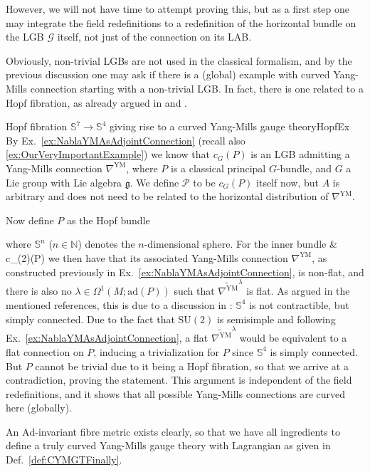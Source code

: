 \documentclass[a4paper,oneside,11pt,bibliography=totoc]{scrartcl}
\def\bas#1\eas{\begin{align*}#1\end{align*}}
\theoremstyle{plain}
\theoremstyle{remark}
\theoremstyle{definition}
\begin{document}
However, we will not have time to attempt proving this, but as a first step one may integrate the field redefinitions to a redefinition of the horizontal bundle on the LGB $\mathcal{G}$ itself, not just of the connection on its LAB.

Obviously, non-trivial LGBs are not used in the classical formalism, and by the previous discussion one may ask if there is a (global) example with curved Yang-Mills connection starting with a non-trivial LGB. In fact, there is one related to a Hopf fibration, as already argued in \cite[\S 5.3, Ex.\ 5.18]{My1stpaper} and \cite[\S 5.1.5, Ex.\ 5.1.35]{MyThesis}.

\begin{examples}{Hopf fibration $\mathds{S}^7 \to \mathds{S}^4$ giving rise to a curved Yang-Mills gauge theory}{HopfEx}
By Ex.\ \ref{ex:NablaYMAsAdjointConnection} (recall also \ref{ex:OurVeryImportantExample}) we know that $c_G(P)$ is an LGB admitting a Yang-Mills connection $\nabla^{\mathrm{YM}}$, where $P$ is a classical principal $G$-bundle, and $G$ a Lie group with Lie algebra $\mathfrak{g}$. We define $\mathcal{P}$ to be $c_G(P)$ itself now, but $A$ is arbitrary and does not need to be related to the horizontal distribution of $\nabla^{\mathrm{YM}}$.

Now define $P$ as the Hopf bundle
\begin{center}
\end{center}
where $\mathds{S}^n$ ($n \in \mathbb{N}$) denotes the $n$-dimensional sphere.
For the inner bundle
\bas
\mathcal{P}
\coloneqq
{}
&\coloneqq
c_{(2)}(P)
\eas
we then have that its associated Yang-Mills connection $\nabla^{\mathrm{YM}}$, as constructed previously in Ex.\ \ref{ex:NablaYMAsAdjointConnection}, is non-flat, and there is also no $\lambda \in \Omega^1(M; \mathrm{ad}(P))$ such that $\widetilde{\nabla^{\mathrm{YM}}}^\lambda$ is flat. As argued in the mentioned references, this is due to a discussion in \cite[Example 7.3.20; page 287]{mackenzieGeneralTheory}: $\mathds{S}^4$ is not contractible, but simply connected. Due to the fact that $\mathrm{SU}(2)$ is semisimple and following Ex.\ \ref{ex:NablaYMAsAdjointConnection}, a flat $\widetilde{\nabla^{\mathrm{YM}}}^\lambda$ would be equivalent to a flat connection on $P$, inducing a trivialization for $P$ since $\mathds{S}^4$ is simply connected. But $P$ cannot be trivial due to it being a Hopf fibration, so that we arrive at a contradiction, proving the statement. This argument is independent of the field redefinitions, and it shows that all possible Yang-Mills connections are curved here (globally).

An $\mathrm{Ad}$-invariant fibre metric exists clearly, so that we have all ingredients to define a truly curved Yang-Mills gauge theory with Lagrangian as given in Def.\ \ref{def:CYMGTFinally}.
\end{examples}
\end{document}
